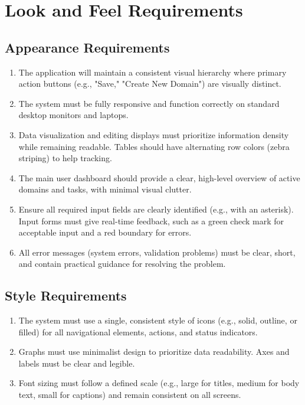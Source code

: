\documentclass[12pt]{article}
\begin{document}
\section{Look and Feel Requirements}
\subsection{Appearance Requirements}
\begin{enumerate}[label=LF-AR\arabic*]
  \item The application will maintain a consistent visual hierarchy where primary action buttons (e.g., "Save," "Create New Domain") are visually distinct.
  \item The system must be fully responsive and function correctly on standard desktop monitors and laptops.
  \item Data visualization and editing displays must prioritize information density while remaining readable. Tables should have alternating row colors (zebra striping) to help tracking.
  \item The main user dashboard should provide a clear, high-level overview of active domains and tasks, with minimal visual clutter.
  \item Ensure all required input fields are clearly identified (e.g., with an asterisk). Input forms must give real-time feedback, such as a green check mark for acceptable input and a red boundary for errors.
  \item All error messages (system errors, validation problems) must be clear, short, and contain practical guidance for resolving the problem.
\end{enumerate}
\subsection{Style Requirements}
\begin{enumerate}[label=LF-SR\arabic*]
  \item The system must use a single, consistent style of icons (e.g., solid, outline, or filled) for all navigational elements, actions, and status indicators.
  \item Graphs must use minimalist design to prioritize data readability. Axes and labels must be clear and legible.
  \item Font sizing must follow a defined scale (e.g., large for titles, medium for body text, small for captions) and remain consistent on all screens.
\end{enumerate}
\end{document}
